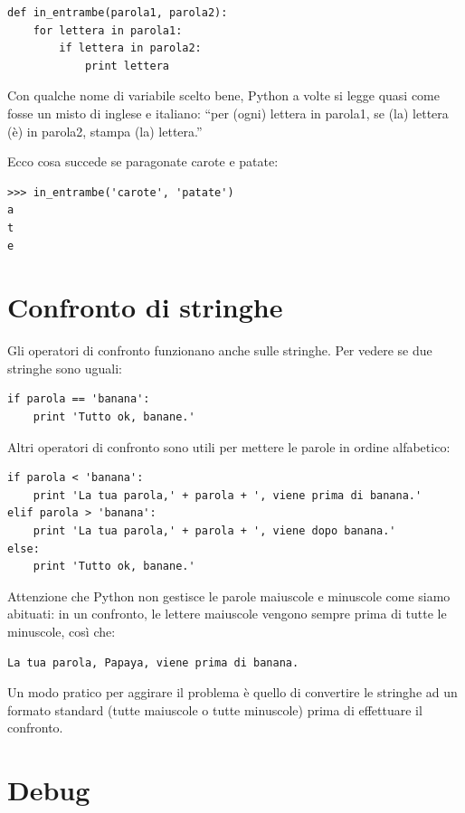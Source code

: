 \documentclass[10pt]{book}
\begin{document}
\begin{verbatim}
def in_entrambe(parola1, parola2):
    for lettera in parola1:
        if lettera in parola2:
            print lettera
\end{verbatim}
%
Con qualche nome di variabile scelto bene, Python a volte si legge quasi come fosse un misto di inglese e italiano: ``per (ogni) lettera in parola1, se (la) lettera (è) in parola2, stampa (la) lettera.''

Ecco cosa succede se paragonate carote e patate:

\begin{verbatim}
>>> in_entrambe('carote', 'patate')
a
t
e
\end{verbatim}
%

\section{Confronto di stringhe}

Gli operatori di confronto funzionano anche sulle stringhe. Per vedere se
due stringhe sono uguali:

\begin{verbatim}
if parola == 'banana':
    print 'Tutto ok, banane.'
\end{verbatim}
%
Altri operatori di confronto sono utili per mettere le parole in ordine alfabetico:

\begin{verbatim}
if parola < 'banana':
    print 'La tua parola,' + parola + ', viene prima di banana.'
elif parola > 'banana':
    print 'La tua parola,' + parola + ', viene dopo banana.'
else:
    print 'Tutto ok, banane.'
\end{verbatim}
%
Attenzione che Python non gestisce le parole maiuscole e minuscole come siamo abituati: in un confronto, le lettere maiuscole vengono sempre prima di tutte le minuscole, così che:

\begin{verbatim}
La tua parola, Papaya, viene prima di banana.
\end{verbatim}
%
Un modo pratico per aggirare il problema è quello di convertire le stringhe ad un formato standard (tutte maiuscole o tutte minuscole) prima di effettuare il confronto.


\section{Debug}
\end{document}
